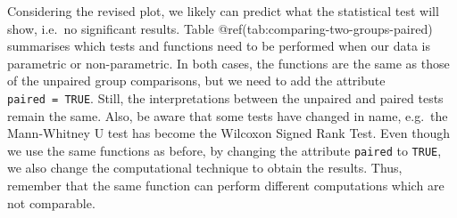 \documentclass[
  letterpaper,
]{krantz}
\begin{document}
Considering the revised plot, we likely can predict what the statistical
test will show, i.e.~no significant results. Table
@ref(tab:comparing-two-groups-paired) summarises which tests and
functions need to be performed when our data is parametric or
non-parametric. In both cases, the functions are the same as those of
the unpaired group comparisons, but we need to add the attribute
\texttt{paired\ =\ TRUE}. Still, the interpretations between the
unpaired and paired tests remain the same. Also, be aware that some
tests have changed in name, e.g.~the Mann-Whitney U test has become the
Wilcoxon Signed Rank Test. Even though we use the same functions as
before, by changing the attribute \texttt{paired} to \texttt{TRUE}, we
also change the computational technique to obtain the results. Thus,
remember that the same function can perform different computations which
are not comparable.
\end{document}
